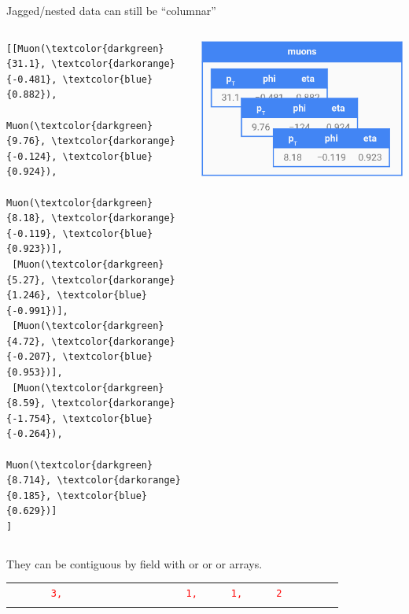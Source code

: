 \documentclass[aspectratio=169]{beamer}
\begin{document}
\begin{frame}[fragile]{Jagged/nested data can still be ``columnar''}
\vspace{0.5 cm}
\begin{columns}
\small
\begin{Verbatim}[commandchars=\\\{\}]
[[Muon(\textcolor{darkgreen}{31.1}, \textcolor{darkorange}{-0.481}, \textcolor{blue}{0.882}),
      Muon(\textcolor{darkgreen}{9.76}, \textcolor{darkorange}{-0.124}, \textcolor{blue}{0.924}),
      Muon(\textcolor{darkgreen}{8.18}, \textcolor{darkorange}{-0.119}, \textcolor{blue}{0.923})],
 [Muon(\textcolor{darkgreen}{5.27}, \textcolor{darkorange}{1.246}, \textcolor{blue}{-0.991})],
 [Muon(\textcolor{darkgreen}{4.72}, \textcolor{darkorange}{-0.207}, \textcolor{blue}{0.953})],
 [Muon(\textcolor{darkgreen}{8.59}, \textcolor{darkorange}{-1.754}, \textcolor{blue}{-0.264}),
      Muon(\textcolor{darkgreen}{8.714}, \textcolor{darkorange}{0.185}, \textcolor{blue}{0.629})]
]
\end{Verbatim}
\includegraphics[width=\linewidth]{muons-as-objects.png}
\end{columns}
\vspace{0.5 cm}
They can be contiguous by field with  or  or  or  arrays.
\vspace{0.25 cm}
\begin{tabular}{r l}
\only<1>{\small \textcolor{red}{counts}  & \textcolor{red}{\tt\scriptsize \ \ \ \ \ 3,\ \ \ \ \ \ \ \ \ \ \ \ \ \ \ \ \ \ \ \ \ \ 1,\ \ \ \ \ \ 1,\ \ \ \ \ \ 2\ \ \ \ \ \ \ \ \ } \\}

\end{tabular}
\end{frame}
\end{document}
